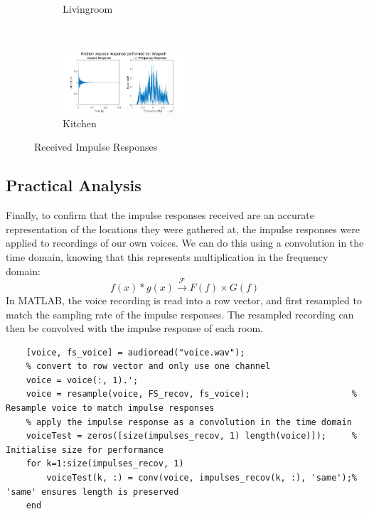 \documentclass[12pt]{article}
\numberwithin{equation}{section}
\numberwithin{figure}{section}
\numberwithin{table}{section}
\begin{document}
\begin{figure}[ht]
\begin{subfigure}{0.5\textwidth}
        \caption{Livingroom\label{fig:p3-livingroom}}
    \end{subfigure} \\
    \begin{subfigure}{\textwidth}
        \centering
        \includegraphics[width=0.5\textwidth]{figures/p3-kitchen.png}
        \caption{Kitchen\label{fig:p3-kitchen}}
    \end{subfigure}
    \caption{Received Impulse Responses\label{fig:p3-impulse-responses}}
\end{figure}

\pagebreak
\subsection{Practical Analysis}
Finally, to confirm that the impulse responses received are an accurate
representation of the locations they were gathered at, the impulse responses
were applied to recordings of our own voices. We can do this using a
convolution in the time domain, knowing that this represents multiplication in
the frequency domain:
\begin{equation*}
    f(x) * g(x) \xrightarrow{\mathscr{F}} F(f) \times G(f)
\end{equation*}
In MATLAB, the voice recording is read into a row vector, and first resampled
to match the sampling rate of the impulse responses. The resampled recording can then be
convolved with the impulse response of each room.

\begin{verbatim}
    [voice, fs_voice] = audioread("voice.wav");
    % convert to row vector and only use one channel
    voice = voice(:, 1).';
    voice = resample(voice, FS_recov, fs_voice);                    % Resample voice to match impulse responses
    % apply the impulse response as a convolution in the time domain
    voiceTest = zeros([size(impulses_recov, 1) length(voice)]);     % Initialise size for performance
    for k=1:size(impulses_recov, 1)
        voiceTest(k, :) = conv(voice, impulses_recov(k, :), 'same');% 'same' ensures length is preserved
    end
\end{verbatim}
\end{document}
